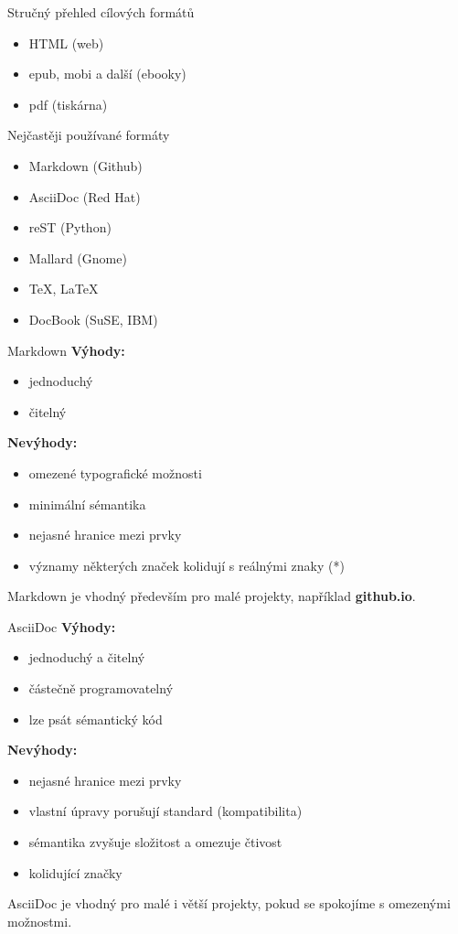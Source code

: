 \documentclass[12pt,a4paper]{beamer}
\begin{document}
	\begin{frame}{Stručný přehled cílových formátů}
		\begin{itemize}
			\item HTML (web)
			\item epub, mobi a další (ebooky)
			\item pdf (tiskárna)
		\end{itemize}
	\end{frame}

	\begin{frame}{Nejčastěji používané formáty}
		\begin{itemize}
			\item Markdown (Github)
			\item AsciiDoc (Red Hat)
			\item reST (Python)
			\item Mallard (Gnome)
			\item \TeX, \LaTeX
			\item DocBook (SuSE, IBM)
		\end{itemize}
	\end{frame}

	\begin{frame}{Markdown}
	\textbf{Výhody:}
	\begin{itemize}
		\item jednoduchý
		\item čitelný
	\end{itemize}	
	\textbf{Nevýhody:}
	\begin{itemize}
		\item omezené typografické možnosti
		\item minimální sémantika
		\item nejasné hranice mezi prvky
		\item významy některých značek kolidují s reálnými znaky (*)
	\end{itemize}				
	Markdown je vhodný především pro malé projekty, například \textbf{github.io}.
	\end{frame}

	\begin{frame}{AsciiDoc}
	\textbf{Výhody:}
	\begin{itemize}
		\item jednoduchý a čitelný
		\item částečně programovatelný
		\item lze psát sémantický kód
	\end{itemize}	
	\textbf{Nevýhody:}
	\begin{itemize}
		\item nejasné hranice mezi prvky
		\item vlastní úpravy porušují standard (kompatibilita)
		\item sémantika zvyšuje složitost a omezuje čtivost
		\item kolidující značky
	\end{itemize}				
	AsciiDoc je vhodný pro malé i větší projekty, pokud se spokojíme s omezenými možnostmi.
	\end{frame}
    
\end{document}

